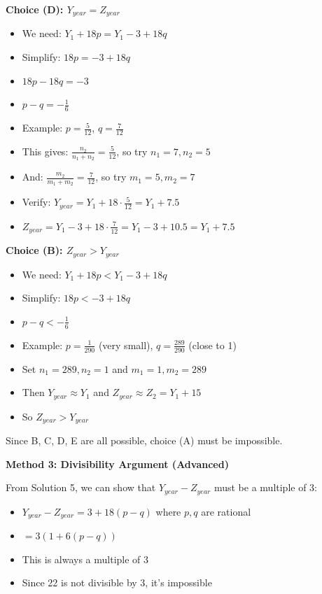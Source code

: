 \documentclass[12pt]{article}
\begin{document}
\begin{solutionbox}
\textbf{Choice (D): $Y_{year} = Z_{year}$}
\begin{itemize}
    \item We need: $Y_1 + 18p = Y_1 - 3 + 18q$
    \item Simplify: $18p = -3 + 18q$
    \item $18p - 18q = -3$
    \item $p - q = -\frac{1}{6}$
    \item Example: $p = \frac{5}{12}$, $q = \frac{7}{12}$
    \item This gives: $\frac{n_2}{n_1+n_2} = \frac{5}{12}$, so try $n_1 = 7, n_2 = 5$
    \item And: $\frac{m_2}{m_1+m_2} = \frac{7}{12}$, so try $m_1 = 5, m_2 = 7$
    \item Verify: $Y_{year} = Y_1 + 18 \cdot \frac{5}{12} = Y_1 + 7.5$
    \item $Z_{year} = Y_1 - 3 + 18 \cdot \frac{7}{12} = Y_1 - 3 + 10.5 = Y_1 + 7.5$ \checkmark
\end{itemize}

\textbf{Choice (B): $Z_{year} > Y_{year}$}
\begin{itemize}
    \item We need: $Y_1 + 18p < Y_1 - 3 + 18q$
    \item Simplify: $18p < -3 + 18q$
    \item $p - q < -\frac{1}{6}$
    \item Example: $p = \frac{1}{290}$ (very small), $q = \frac{289}{290}$ (close to 1)
    \item Set $n_1 = 289, n_2 = 1$ and $m_1 = 1, m_2 = 289$
    \item Then $Y_{year} \approx Y_1$ and $Z_{year} \approx Z_2 = Y_1 + 15$
    \item So $Z_{year} > Y_{year}$ \checkmark
\end{itemize}

Since B, C, D, E are all possible, choice (A) must be impossible.

\textbf{Method 3: Divisibility Argument (Advanced)}

From Solution 5, we can show that $Y_{year} - Z_{year}$ must be a multiple of 3:
\begin{itemize}
    \item $Y_{year} - Z_{year} = 3 + 18(p - q)$ where $p, q$ are rational
    \item $= 3(1 + 6(p - q))$
    \item This is always a multiple of 3
    \item Since 22 is not divisible by 3, it's impossible
\end{itemize}

\end{solutionbox}
\end{document}
